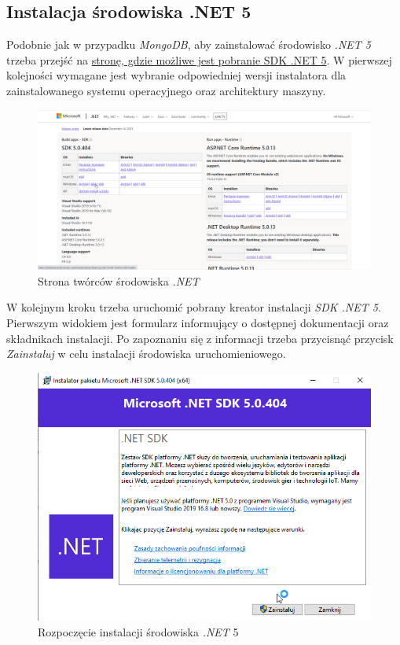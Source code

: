 \documentclass[a4paper,twoside,12pt]{book}
\begin{document}
\subsection{Instalacja środowiska .NET 5}
Podobnie jak w przypadku \textit{MongoDB}, aby zainstalować środowisko \textit{.NET 5} trzeba przejść na \href{https://dotnet.microsoft.com/en-us/download/dotnet/5.0}{stronę, gdzie możliwe jest pobranie SDK .NET 5}. W pierwszej kolejności wymagane jest wybranie odpowiedniej wersji instalatora dla zainstalowanego systemu operacyjnego oraz architektury maszyny.
\begin{figure}[H]
	\centering
	\includegraphics[width=0.7\linewidth]{../zrzuty_ekranu/instalacja_dotnet5/dotnet_sdk}
	\caption{Strona twórców środowiska \textit{.NET}}
	\label{fig:dotnetsdk}
\end{figure}

W kolejnym kroku trzeba uruchomić pobrany kreator instalacji \textit{SDK .NET 5}. Pierwszym widokiem jest formularz informujący o dostępnej dokumentacji oraz składnikach instalacji. Po zapoznaniu się z informacji trzeba przycisnąć przycisk \textit{Zainstaluj} w celu instalacji środowiska uruchomieniowego.
\begin{figure}[H]
	\centering
	\includegraphics[width=0.7\linewidth]{../zrzuty_ekranu/instalacja_dotnet5/dotnet1}
	\caption{Rozpoczęcie instalacji środowiska \textit{.NET }5}
	\label{fig:dotnet1}
\end{figure}
\end{document}
